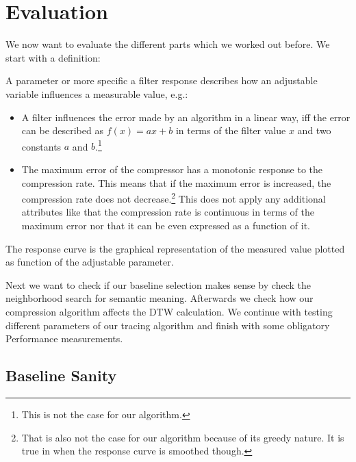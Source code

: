 \chapter{Evaluation}
\label{ch:evaluation}

We now want to evaluate the different parts which we worked out before. We start with a definition:

\begin{definition}
    A parameter or more specific a filter response describes how an adjustable variable influences a measurable value, e.g.:

    \begin{itemize}
        \item A filter influences the error made by an algorithm in a linear way, iff the error can be described as $f(x) = ax + b$ in terms of the filter value $x$ and two constants $a$ and $b$.\footnote{This is not the case for our algorithm.}
        \item The maximum error of the compressor has a monotonic response to the compression rate. This means that if the maximum error is increased, the compression rate does not decrease.\footnote{That is also not the case for our algorithm because of its greedy nature. It is true in when the response curve is smoothed though.} This does not apply any additional attributes like that the compression rate is continuous in terms of the maximum error nor that it can be even expressed as a function of it.
    \end{itemize}

    The response curve is the graphical representation of the measured value plotted as function of the adjustable parameter.
\end{definition}

Next we want to check if our baseline selection makes sense by check the neighborhood search for semantic meaning. Afterwards we check how our compression algorithm affects the DTW calculation. We continue with testing different parameters of our tracing algorithm and finish with some obligatory Performance measurements.



\section{Baseline Sanity}
\label{sec:evaluation:baseline}

